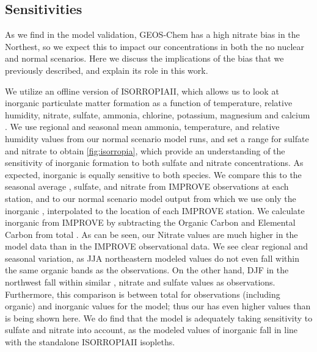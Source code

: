 \documentclass[12]{article}
\begin{document}
\subsection{ Sensitivities}
As we find in the model validation, GEOS-Chem has a high nitrate bias in the Northest, so we expect this to impact our  concentrations in both the no nuclear and normal scenarios. Here we discuss the implications of the bias that we previously described, and explain its role in this work.

We utilize an offline version of ISORROPIAII, which allows us to look at inorganic particulate matter formation as a function of temperature, relative humidity, nitrate, sulfate, ammonia, chlorine, potassium, magnesium and calcium \citep{fountoukis_isorropia_2007}. We use regional and seasonal mean ammonia, temperature, and relative humidity values from our normal scenario model runs, and set a range for sulfate and nitrate to obtain \ref{fig:isorropia}, which provide an understanding of the sensitivity of inorganic  formation to both sulfate and nitrate concentrations. As expected, inorganic  is equally sensitive to both species. We compare this to the seasonal average , sulfate, and nitrate from IMPROVE observations at each station, and to our normal scenario model output from which we use only the inorganic , interpolated to the location of each IMPROVE station. We calculate inorganic  from IMPROVE by subtracting the Organic Carbon and Elemental Carbon from total . As can be seen, our Nitrate values are much higher in the model data than in the IMPROVE observational data. We see clear regional and seasonal variation, as JJA northeastern modeled values do not even fall within the same organic  bands as the observations. On the other hand, DJF in the northwest fall within similar , nitrate and sulfate values as observations. Furthermore, this comparison is between total  for observations (including organic) and inorganic  values for the model; thus our  has even higher values than is being shown here. We do find that the model is adequately taking sensitivity to sulfate and nitrate into account, as the modeled values of inorganic  fall in line with the standalone ISORROPIAII isopleths.
\end{document}
